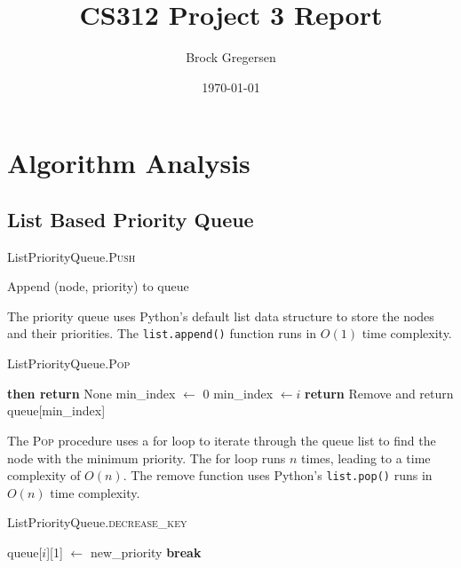 \documentclass[12pt]{article}
\title{CS312 Project 3 Report}
\author{Brock Gregersen}
\date{\today}
\begin{document}
\maketitle
\tableofcontents

\newpage

\section{Algorithm Analysis}

\subsection{List Based Priority Queue}

\begin{algorithm}
    \caption{ListPriorityQueue.\textsc{Push}}
    \begin{algorithmic}[1]
        \State Append (node, priority) to queue 
    \end{algorithmic}
\end{algorithm}

The priority queue uses Python's default list data structure to store the nodes
and their priorities. The \texttt{list.append()} function runs in $O(1)$ time complexity.

\begin{algorithm}[H]
    \caption{ListPriorityQueue.\textsc{Pop}}
    \begin{algorithmic}[1]
            \State \textbf{then return} None
        \EndIf
        \State min\_index $\gets$ 0
         
                \State min\_index $\gets i$
            \EndIf
        \EndFor
        \State \textbf{return} Remove and return queue[min\_index] 
    \end{algorithmic}
\end{algorithm}

The \textsc{Pop} procedure uses a for loop to iterate through the queue list
to find the node with the minimum priority. The for loop runs $n$ times, leading
to a time complexity of $O(n)$. The remove function uses Python's \texttt{list.pop()}
runs in $O(n)$ time complexity.

\begin{algorithm}[H]
    \caption{ListPriorityQueue.\textsc{decrease\_key}}
    \begin{algorithmic}[1]
         
                \State queue[$i$][1] $\gets$ new\_priority
                \State \textbf{break}
            \EndIf
        \EndFor
    \end{algorithmic}
\end{algorithm}
\end{document}
